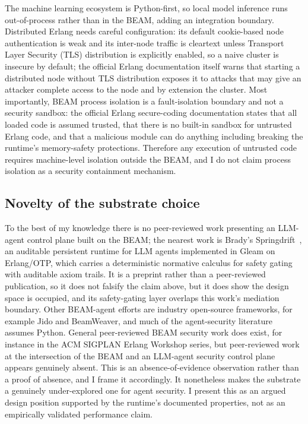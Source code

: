 \documentclass[11pt,letterpaper]{article}
\begin{document}
The machine learning ecosystem is Python-first, so local model inference runs out-of-process rather than in the BEAM, adding an integration boundary. Distributed Erlang needs careful configuration: its default cookie-based node authentication is weak and its inter-node traffic is cleartext unless Transport Layer Security (TLS) distribution is explicitly enabled, so a naive cluster is insecure by default; the official Erlang documentation itself warns that starting a distributed node without TLS distribution exposes it to attacks that may give an attacker complete access to the node and by extension the cluster. Most importantly, BEAM process isolation is a fault-isolation boundary and not a security sandbox: the official Erlang secure-coding documentation states that all loaded code is assumed trusted, that there is no built-in sandbox for untrusted Erlang code, and that a malicious module can do anything including breaking the runtime's memory-safety protections. Therefore any execution of untrusted code requires machine-level isolation outside the BEAM, and I do not claim process isolation as a security containment mechanism.

\subsection{Novelty of the substrate choice}\label{sec:beam-novelty}

To the best of my knowledge there is no peer-reviewed work presenting an LLM-agent control plane built on the BEAM; the nearest work is Brady's Springdrift~\cite{brady2026}, an auditable persistent runtime for LLM agents implemented in Gleam on Erlang/OTP, which carries a deterministic normative calculus for safety gating with auditable axiom trails. It is a preprint rather than a peer-reviewed publication, so it does not falsify the claim above, but it does show the design space is occupied, and its safety-gating layer overlaps this work's mediation boundary. Other BEAM-agent efforts are industry open-source frameworks, for example Jido and BeamWeaver, and much of the agent-security literature assumes Python. General peer-reviewed BEAM security work does exist, for instance in the ACM SIGPLAN Erlang Workshop series, but peer-reviewed work at the intersection of the BEAM and an LLM-agent security control plane appears genuinely absent. This is an absence-of-evidence observation rather than a proof of absence, and I frame it accordingly. It nonetheless makes the substrate a genuinely under-explored one for agent security. I present this as an argued design position supported by the runtime's documented properties, not as an empirically validated performance claim.
\end{document}
